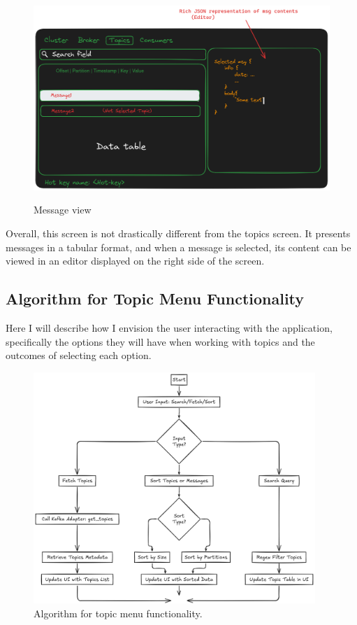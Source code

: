 \documentclass[10pt , a4paper]{report}
\begin{document}
\begin{figure}[htbp]
    \centering
    \includegraphics[width=.8\linewidth]{imgs/MessageView.png}
    \label{fig:message_view}
    \caption{Message view}
\end{figure}

Overall, this screen is not drastically different from the topics screen. It presents messages in a tabular format, and when a message is selected, its content can be viewed in an editor displayed on the right side of the screen.

\subsection{Algorithm for Topic Menu Functionality}

Here I will describe how I envision the user interacting with the application, specifically the options they will have when working with topics and the outcomes of selecting each option.

\begin{figure}[htbp]
  \begin{center}
    \includegraphics[width=0.95\textwidth]{imgs/TopicsAlgorithm.png}
  \end{center}
  \caption{Algorithm for topic menu functionality.}\label{fig:}
\end{figure}
\end{document}
